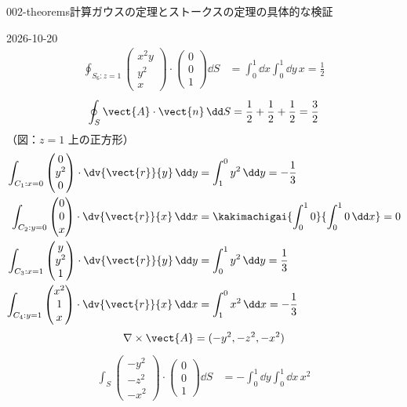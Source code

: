 \documentclass[uplatex,dvipdfmx,a4paper,11pt]{jsarticle}
\begin{document}
\begin{mondai}{002-theorems}{計算}{ガウスの定理とストークスの定理の具体的な検証}
\begin{kotaeutsushi}{2026-10-20}
\begin{align*}
\oint_{S_{6}:z=1}\begin{pmatrix}x^{2}y\\y^{2}\\x\end{pmatrix}\cdot\begin{pmatrix}0\\0\\1\end{pmatrix}\dd S&=\int_{0}^{1}\dd x\int_{0}^{1}\dd y\,x=\frac{1}{2}
\end{align*}
\[ \oint_{S}\vect{A}\cdot\vect{n}\,\dd S=\frac{1}{2}+\frac{1}{2}+\frac{1}{2}=\frac{3}{2} \]
（図：$z=1$ 上の正方形）
\begin{align*}
\int_{C_{1}:x=0}\begin{pmatrix}0\\y^{2}\\0\end{pmatrix}\cdot\dv{\vect{r}}{y}\,\dd y&=\int_{1}^{0}y^{2}\,\dd y=-\frac{1}{3}\\
\int_{C_{2}:y=0}\begin{pmatrix}0\\0\\x\end{pmatrix}\cdot\dv{\vect{r}}{x}\,\dd x&=\kakimachigai{\int_{0}^{1}0}{\int_{0}^{1}0\,\dd x}=0\\
\int_{C_{3}:x=1}\begin{pmatrix}y\\y^{2}\\1\end{pmatrix}\cdot\dv{\vect{r}}{y}\,\dd y&=\int_{0}^{1}y^{2}\,\dd y=\frac{1}{3}\\
\int_{C_{4}:y=1}\begin{pmatrix}x^{2}\\1\\x\end{pmatrix}\cdot\dv{\vect{r}}{x}\,\dd x&=\int_{1}^{0}x^{2}\,\dd x=-\frac{1}{3}
\end{align*}
\[ \nabla\times\vect{A}=(-y^{2},-z^{2},-x^{2}) \]
\begin{align*}
\int_{S}\begin{pmatrix}-y^{2}\\-z^{2}\\-x^{2}\end{pmatrix}\cdot\begin{pmatrix}0\\0\\1\end{pmatrix}\dd S&=-\int_{0}^{1}\dd y\int_{0}^{1}\dd x\,x^{2}\\

\end{align*}
\end{kotaeutsushi}
\end{mondai}
\end{document}
